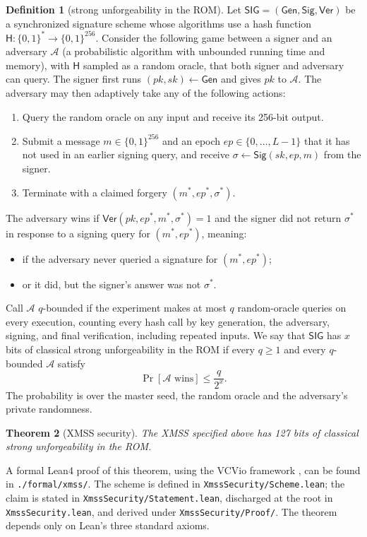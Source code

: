 \documentclass[11pt]{article}
\theoremstyle{definition}
\newtheorem{definition}{Definition}[section]
\theoremstyle{plain}
\newtheorem{theorem}[definition]{Theorem}
\theoremstyle{remark}
\newcommand{\bits}[1]{\{0,1\}^{#1}}
\newcommand{\Gen}{\mathsf{Gen}}
\newcommand{\Sig}{\mathsf{Sig}}
\newcommand{\Ver}{\mathsf{Ver}}
\newcommand{\SIG}{\mathsf{SIG}}
\newcommand{\hash}{\mathsf{H}}
\newcommand{\ep}{\mathit{ep}}
\newcommand{\sk}{\mathit{sk}}
\newcommand{\pk}{\mathit{pk}}
\begin{document}
\begin{definition}[strong unforgeability in the ROM]
Let $\SIG=(\Gen,\Sig,\Ver)$ be a synchronized signature scheme whose algorithms use a hash function $\hash:\bits{*}\to\bits{256}$. Consider the following game between a signer and an adversary $\mathcal A$ (a probabilistic algorithm with unbounded running time and memory), with $\hash$ sampled as a random oracle, that both signer and adversary can query. The signer first runs $(\pk,\sk)\gets\Gen$ and gives $\pk$ to $\mathcal A$. The adversary may then adaptively take any of the following actions:
\begin{enumerate}[leftmargin=2em]
  \item Query the random oracle on any input and receive its 256-bit output.
  \item Submit a message $m\in\bits{256}$ and an epoch $\ep\in\{0,\ldots,L-1\}$ that it has not used in an earlier signing query, and receive $\sigma\gets\Sig(\sk,\ep,m)$ from the signer.
  \item Terminate with a claimed forgery $(m^*,\ep^*,\sigma^*)$.
\end{enumerate}
The adversary wins if $\Ver(\pk,\ep^*,m^*,\sigma^*)=1$ and the signer did not return $\sigma^*$ in response to a signing query for $(m^*,\ep^*)$, meaning:
\begin{itemize}[leftmargin=2em]
  \item if the adversary never queried a signature for $(m^*,\ep^*)$;
  \item or it did, but the signer's answer was not $\sigma^*$.
\end{itemize}

Call $\mathcal A$ $q$-bounded if the experiment makes at most $q$ random-oracle queries on every execution, counting every hash call by key generation, the adversary, signing, and final verification, including repeated inputs. We say that $\SIG$ has $x$ bits of classical strong unforgeability in the ROM if every $q\geq1$ and every $q$-bounded $\mathcal A$ satisfy
\[
  \Pr[\mathcal A\text{ wins}]\leq\frac{q}{2^{x}}.
\]
The probability is over the master seed, the random oracle and the adversary's private randomness.
\end{definition}

\begin{theorem}[XMSS security]
The XMSS specified above has 127 bits of classical strong unforgeability in the ROM.
\end{theorem}

A formal Lean4 proof of this theorem, using the VCVio framework \cite{VCVio}, can be found in \texttt{./formal/xmss/}. The scheme is defined in \texttt{XmssSecurity/Scheme.lean}; the claim is stated in \texttt{XmssSecurity/Statement.lean}, discharged at the root in \texttt{XmssSecurity.lean}, and derived under \texttt{XmssSecurity/Proof/}. The theorem depends only on Lean's three standard axioms.
\end{document}
